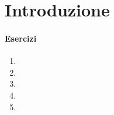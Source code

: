 \chapter*{Introduzione}
\subsubsection*{Esercizi}
\begin{enumerate}
    \item 
    \item 
    \item 
    \item 
    \item 
\end{enumerate}